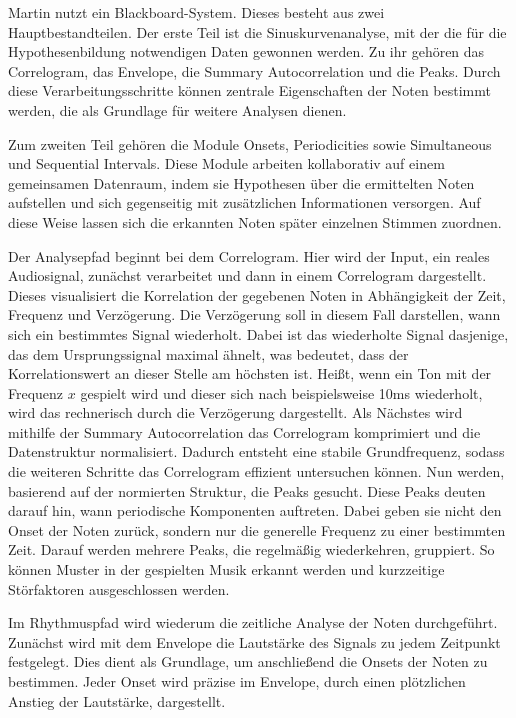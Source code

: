 Martin nutzt ein Blackboard-System.
Dieses besteht aus zwei Hauptbestandteilen.
Der erste Teil ist die Sinuskurvenanalyse, mit der die für die Hypothesenbildung notwendigen Daten gewonnen werden.
Zu ihr gehören das Correlogram, das Envelope, die Summary Autocorrelation und die Peaks.
Durch diese Verarbeitungsschritte können zentrale Eigenschaften der Noten bestimmt werden,
die als Grundlage für weitere Analysen dienen.

Zum zweiten Teil gehören die Module Onsets, Periodicities sowie Simultaneous und Sequential Intervals.
Diese Module arbeiten kollaborativ auf einem gemeinsamen Datenraum,
indem sie Hypothesen über die ermittelten Noten aufstellen und sich gegenseitig mit zusätzlichen Informationen versorgen.
Auf diese Weise lassen sich die erkannten Noten später einzelnen Stimmen zuordnen.

Der Analysepfad beginnt bei dem Correlogram.
Hier wird der Input, ein reales Audiosignal,
zunächst verarbeitet und dann in einem Correlogram dargestellt.
Dieses visualisiert die Korrelation der gegebenen Noten in Abhängigkeit der Zeit, Frequenz und Verzögerung.
Die Verzögerung soll in diesem Fall darstellen, wann sich ein bestimmtes Signal wiederholt.
Dabei ist das wiederholte Signal dasjenige, das dem Ursprungssignal maximal ähnelt,
was bedeutet, dass der Korrelationswert an dieser Stelle am höchsten ist.
Heißt, wenn ein Ton mit der Frequenz $x$ gespielt wird
und dieser sich nach beispielsweise 10ms wiederholt, wird das rechnerisch durch die Verzögerung dargestellt.
Als Nächstes wird mithilfe der Summary Autocorrelation das Correlogram komprimiert
und die Datenstruktur normalisiert.
Dadurch entsteht eine stabile Grundfrequenz,
sodass die weiteren Schritte das Correlogram effizient untersuchen können.
Nun werden, basierend auf der normierten Struktur, die Peaks gesucht.
Diese Peaks deuten darauf hin, wann periodische Komponenten auftreten.
Dabei geben sie nicht den Onset der Noten zurück, sondern nur die generelle Frequenz zu einer bestimmten Zeit.
Darauf werden mehrere Peaks, die regelmäßig wiederkehren, gruppiert.
So können Muster in der gespielten Musik erkannt werden und kurzzeitige Störfaktoren ausgeschlossen werden.

Im Rhythmuspfad wird wiederum die zeitliche Analyse der Noten durchgeführt.
Zunächst wird mit dem Envelope die Lautstärke des Signals zu jedem Zeitpunkt festgelegt.
Dies dient als Grundlage, um anschließend die Onsets der Noten zu bestimmen.
Jeder Onset wird präzise im Envelope, durch einen plötzlichen Anstieg der Lautstärke, dargestellt.

